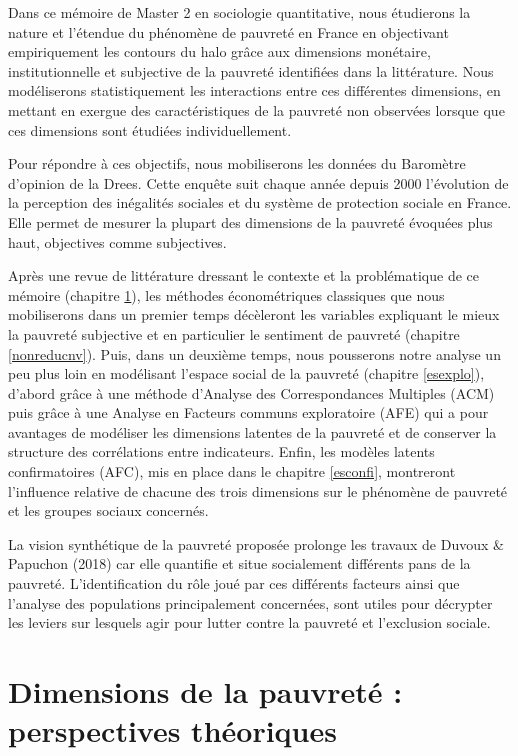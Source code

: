 \documentclass[12pt,a4paper]{reedthesis}
\begin{document}
Dans ce mémoire de Master 2 en sociologie quantitative, nous étudierons la nature et l'étendue du phénomène de pauvreté en France en objectivant empiriquement les contours du halo grâce aux dimensions monétaire, institutionnelle et subjective de la pauvreté identifiées dans la littérature. Nous modéliserons statistiquement les interactions entre ces différentes dimensions, en mettant en exergue des caractéristiques de la pauvreté non observées lorsque que ces dimensions sont étudiées individuellement.

Pour répondre à ces objectifs, nous mobiliserons les données du Baromètre d'opinion de la Drees. Cette enquête suit chaque année depuis 2000 l'évolution de la perception des inégalités sociales et du système de protection sociale en France. Elle permet de mesurer la plupart des dimensions de la pauvreté évoquées plus haut, objectives comme subjectives.

Après une revue de littérature dressant le contexte et la problématique de ce mémoire (chapitre \ref{chap1}), les méthodes économétriques classiques que nous mobiliserons dans un premier temps décèleront les variables expliquant le mieux la pauvreté subjective et en particulier le sentiment de pauvreté (chapitre \ref{nonreducnv}). Puis, dans un deuxième temps, nous pousserons notre analyse un peu plus loin en modélisant l'espace social de la pauvreté (chapitre \ref{esexplo}), d'abord grâce à une méthode d'Analyse des Correspondances Multiples (ACM) puis grâce à une Analyse en Facteurs communs exploratoire (AFE) qui a pour avantages de modéliser les dimensions latentes de la pauvreté et de conserver la structure des corrélations entre indicateurs. Enfin, les modèles latents confirmatoires (AFC), mis en place dans le chapitre \ref{esconfi}, montreront l'influence relative de chacune des trois dimensions sur le phénomène de pauvreté et les groupes sociaux concernés.

La vision synthétique de la pauvreté proposée prolonge les travaux de Duvoux \& Papuchon (2018) car elle quantifie et situe socialement différents pans de la pauvreté. L'identification du rôle joué par ces différents facteurs ainsi que l'analyse des populations principalement concernées, sont utiles pour décrypter les leviers sur lesquels agir pour lutter contre la pauvreté et l'exclusion sociale.

\hypertarget{chap1}{%
\chapter{Dimensions de la pauvreté : perspectives théoriques}\label{chap1}}
\end{document}

